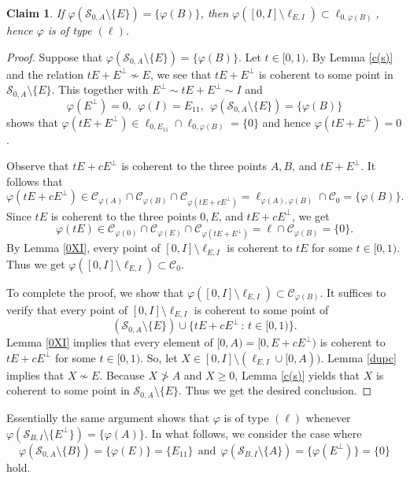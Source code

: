 \documentclass[10pt]{amsart}
\newtheorem{claim}[theorem]{Claim}
\theoremstyle{definition}
\theoremstyle{remark}
\numberwithin{subsection}{section}
\numberwithin{equation}{section}
\newcommand\cC{{\mathcal{C}}}
\begin{document}
\begin{claim}
If $\varphi(\mathcal{S}_{0, A}\setminus\{E\})=\{\varphi(B)\}$, then $\varphi([0, I]\setminus\ell_{E, I})\subset \ell_{0, \varphi(B)}$, hence $\varphi$ is of type $(\ell)$.
\end{claim} 
\begin{proof}
Suppose that $\varphi(\mathcal{S}_{0, A}\setminus\{E\})=\{\varphi(B)\}$.
Let $t\in [0,1)$. 
By Lemma \ref{c(s)} and the relation $tE+E^\perp\not\sim E$, we see that $tE+E^\perp$ is coherent to some point in $\mathcal{S}_{0, A}\setminus\{E\}$. 
This together with $E^\perp\sim tE+E^\perp\sim I$ and 
\[
\varphi(E^\perp)=0,\ \ \varphi(I)=E_{11},\ \  \varphi(\mathcal{S}_{0, A}\setminus\{E\})=\{\varphi(B)\}
\]
shows that $\varphi(tE+E^\perp) \in \ell_{0,E_{11}}\cap \ell_{0, \varphi(B)} =\{0\}$
and hence
$\varphi(tE+E^\perp)= 0$. 


Observe that $tE+cE^\perp$ is coherent to the three points $A, B$, and $tE+E^\perp$.
It follows that 
\[
\varphi (tE+cE^\perp) \in \cC_{\varphi(A)}\cap \cC_{\varphi(B)}\cap\cC_{\varphi(tE+cE^\perp)} =\ell_{\varphi(A), \varphi(B)}\cap \cC_0=\{\varphi(B)\}.
\]
Since $tE$ is coherent to the three points $0, E$, and $tE+cE^\perp$, we get
\[
\varphi(tE) \in \cC_{\varphi(0)}\cap\cC_{\varphi(E)}\cap\cC_{\varphi(tE+E^\perp)} = \ell\cap \cC_{\varphi(B)} =\{0\}.
\]
By Lemma \ref{0XI}, every point of $[0, I]\setminus\ell_{E, I}$ is coherent to $tE$ for some $t\in [0,1)$. 
Thus we get $\varphi([0, I]\setminus\ell_{E, I})\subset \cC_0$.

To complete the proof, we show that $\varphi([0, I]\setminus\ell_{E, I})\subset \cC_{\varphi(B)}$. 
It suffices to verify that every point of $[0, I]\setminus\ell_{E, I}$ is coherent to some point of 
\[
(\mathcal{S}_{0, A}\setminus\{E\})\cup \{tE+cE^\perp\,:\, t\in [0,1)\}.
\]
Lemma \ref{0XI} implies that every element of $[0,A)=[0, E + cE^\perp)$ is coherent to $tE+cE^\perp$ for some $t\in [0,1)$.
So, let $X \in [0, I]\setminus(\ell_{E, I}\cup [0, A))$. 
Lemma \ref{dupc} implies that $X\not\sim E$. 
Because $X\not> A$ and $X \ge 0$,  Lemma \ref{c(s)} yields that $X$ is coherent to some point in  $\mathcal{S}_{0, A}\setminus\{E\}$. 
Thus we get the desired conclusion. 
\end{proof}

Essentially the same argument shows that $\varphi$ is of type $(\ell)$ whenever $\varphi(\mathcal{S}_{B, I}\setminus\{{E^\perp}\})=\{\varphi(A)\}$. 
In what follows, we consider the case where 
\[
\varphi(\mathcal{S}_{0, A}\setminus\{B\})=\{\varphi(E)\}=\{E_{11}\}\ \ \text{and}\ \ \varphi(\mathcal{S}_{B, I}\setminus\{A\})=\{\varphi(E^\perp)\}=\{0\}
\]
hold.
\end{document}

